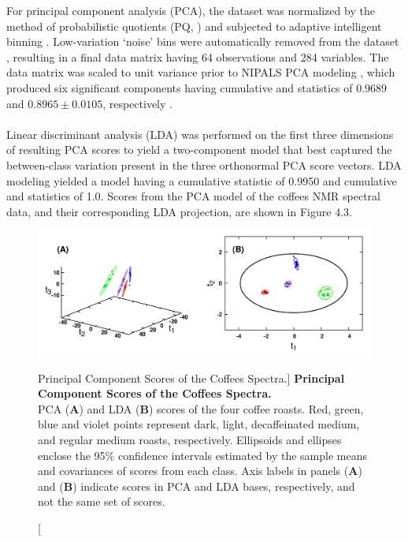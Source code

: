 \begin{doublespace}
For principal component analysis (PCA), the dataset was normalized by the
method of probabilistic quotients (PQ, \cite{dieterle:anchem2006}) and
subjected to adaptive intelligent binning \cite{demeyer:anchem2008}.
Low-variation `noise' bins were automatically removed from the dataset
\cite{zhang:opin2008}, resulting in a final data matrix having 64 observations
and 284 variables. The data matrix was scaled to unit variance
\cite{vandenberg:bmcg2006} prior to NIPALS PCA modeling \cite{jolliffe2002},
which produced six significant components having cumulative \rsqx{} and
\qsq{} statistics of 0.9689 and $0.8965 \pm 0.0105$, respectively
\cite{eshghi:cils2014}.
\\\\
Linear discriminant analysis (LDA) was performed on the first three dimensions
of resulting PCA scores to yield a two-component model that best
captured the between-class variation present in the three orthonormal PCA
score vectors. LDA modeling yielded a model having a cumulative \rsqx{}
statistic of 0.9950 and cumulative \rsqy{} and \qsq{} statistics of 1.0.
Scores from the PCA model of the coffees \hnmr{} NMR spectral data, and
their corresponding LDA projection, are shown in Figure 4.3.
\end{doublespace}

\begin{figure}[ht!]
\includegraphics[width=6.5in]{figs/apps/03-pca-lda.png}
\caption
      [Principal Component Scores of the Coffees Spectra.]{
  {\bf Principal Component Scores of the Coffees Spectra.}
  \\
  PCA ({\bf A}) and LDA ({\bf B}) scores of the four coffee roasts. Red,
  green, blue and violet points represent dark, light, decaffeinated medium,
  and regular medium roasts, respectively. Ellipsoids and ellipses enclose
  the 95\% confidence intervals estimated by the sample means and covariances
  of scores from each class. Axis labels in panels ({\bf A}) and ({\bf B})
  indicate scores in PCA and LDA bases, respectively, and not the same set
  of scores.
}
\end{figure}

